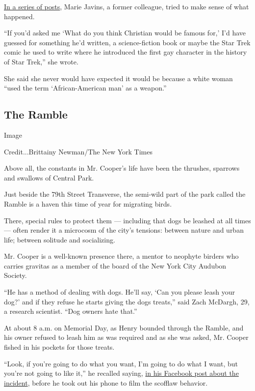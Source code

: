 \href{https://mariejavins.blogspot.com/2020/05/she-went-there.html}{In a
series of posts}, Marie Javins, a former colleague, tried to make sense
of what happened.

``If you'd asked me `What do you think Christian would be famous for,'
I'd have guessed for something he'd written, a science-fiction book or
maybe the Star Trek comic he used to write where he introduced the first
gay character in the history of Star Trek,'' she wrote.

She said she never would have expected it would be because a white woman
``used the term `African-American man' as a weapon.''

\hypertarget{the-ramble}{%
\subsection{The Ramble}\label{the-ramble}}

Image

Credit...Brittainy Newman/The New York Times

Above all, the constants in Mr. Cooper's life have been the thrushes,
sparrows and swallows of Central Park.

Just beside the 79th Street Transverse, the semi-wild part of the park
called the Ramble is a haven this time of year for migrating birds.

There, special rules to protect them --- including that dogs be leashed
at all times --- often render it a microcosm of the city's tensions:
between nature and urban life; between solitude and socializing.

Mr. Cooper is a well-known presence there, a mentor to neophyte birders
who carries gravitas as a member of the board of the New York City
Audubon Society.

``He has a method of dealing with dogs. He'll say, `Can you please leash
your dog?' and if they refuse he starts giving the dogs treats,'' said
Zach McDargh, 29, a research scientist. ``Dog owners hate that.''

At about 8 a.m. on Memorial Day, as Henry bounded through the Ramble,
and his owner refused to leash him as was required and as she was asked,
Mr. Cooper fished in his pockets for those treats.

``Look, if you're going to do what you want, I'm going to do what I
want, but you're not going to like it,'' he recalled saying,
\href{https://m.facebookcorewwwi.onion/story.php?story_fbid=10158742137255229\&id=671885228}{in
his Facebook post about the incident}, before he took out his phone to
film the scofflaw behavior.

